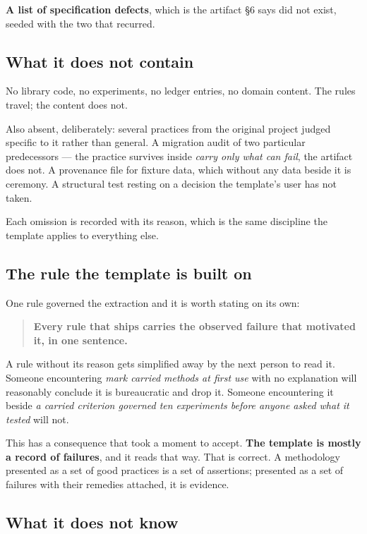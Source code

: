 \textbf{A list of specification defects}, which is the artifact \S6 says did not exist, seeded with the two that recurred.

\subsection{What it does not contain}

No library code, no experiments, no ledger entries, no domain content. The rules travel; the content does not.

Also absent, deliberately: several practices from the original project judged specific to it rather than general. A migration audit of two particular predecessors --- the practice survives inside \textit{carry only what can fail}, the artifact does not. A provenance file for fixture data, which without any data beside it is ceremony. A structural test resting on a decision the template's user has not taken.

Each omission is recorded with its reason, which is the same discipline the template applies to everything else.

\subsection{The rule the template is built on}

One rule governed the extraction and it is worth stating on its own:

\begin{quote}
\textbf{Every rule that ships carries the observed failure that motivated it, in one sentence.}
\end{quote}

A rule without its reason gets simplified away by the next person to read it. Someone encountering \textit{mark carried methods at first use} with no explanation will reasonably conclude it is bureaucratic and drop it. Someone encountering it beside \textit{a carried criterion governed ten experiments before anyone asked what it tested} will not.

This has a consequence that took a moment to accept. \textbf{The template is mostly a record of failures}, and it reads that way. That is correct. A methodology presented as a set of good practices is a set of assertions; presented as a set of failures with their remedies attached, it is evidence.

\subsection{What it does not know}

